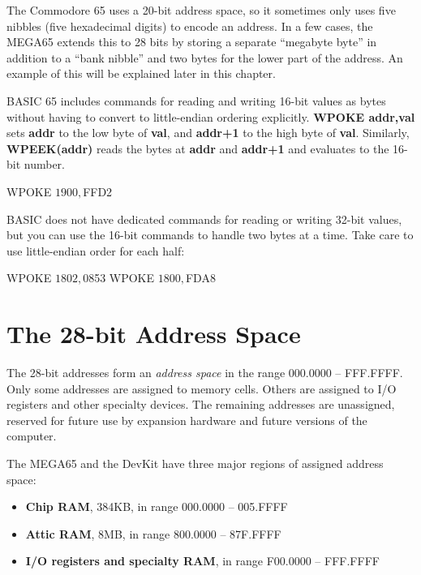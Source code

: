 The Commodore 65 uses a 20-bit address space, so it sometimes only uses five nibbles (five hexadecimal digits) to encode an address. In a few cases, the MEGA65 extends this to 28 bits by storing a separate ``megabyte byte'' in addition to a ``bank nibble'' and two bytes for the lower part of the address. An example of this will be explained later in this chapter.

BASIC 65 includes commands for reading and writing 16-bit values as bytes without having to convert to little-endian ordering explicitly. {\bf WPOKE addr,val} sets {\bf addr} to the low byte of {\bf val}, and {\bf addr+1} to the high byte of {\bf val}. Similarly, {\bf WPEEK(addr)} reads the bytes at {\bf addr} and {\bf addr+1} and evaluates to the 16-bit number.

\begin{basiccode}
WPOKE $1900,$FFD2
\end{basiccode}

BASIC does not have dedicated commands for reading or writing 32-bit values, but you can use the 16-bit commands to handle two bytes at a time. Take care to use little-endian order for each half:

\begin{basiccode}
WPOKE $1802, $0853
WPOKE $1800, $FDA8
\end{basiccode}


\newpage
\section{The 28-bit Address Space}
\label{sec:programming-with-memory-address-space}

The 28-bit addresses form an {\em address space} in the range 000.0000 -- FFF.FFFF. Only some addresses are assigned to memory cells. Others are assigned to I/O registers and other specialty devices. The remaining addresses are unassigned, reserved for future use by expansion hardware and future versions of the computer.

The MEGA65 and the DevKit have three major regions of assigned address space:

\begin{itemize}
\item {\bf Chip RAM}, 384KB, in range 000.0000 -- 005.FFFF
\item {\bf Attic RAM}, 8MB, in range 800.0000 -- 87F.FFFF
\item {\bf I/O registers and specialty RAM}, in range F00.0000 -- FFF.FFFF
\end{itemize}

